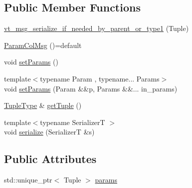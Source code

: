 \subsection*{Public Member Functions}
\begin{DoxyCompactItemize}
\item 
\hyperlink{structvt_1_1vrt_1_1collection_1_1_param_col_msg_3_01_tuple_00_01_col_t_00_01std_1_1enable__if__te13868956e9675e27cec8f332bda9d5e_a70d6345f2e6c9fab0c48b03bc87b3281}{vt\+\_\+msg\+\_\+serialize\+\_\+if\+\_\+needed\+\_\+by\+\_\+parent\+\_\+or\+\_\+type1} (Tuple)
\item 
\hyperlink{structvt_1_1vrt_1_1collection_1_1_param_col_msg_3_01_tuple_00_01_col_t_00_01std_1_1enable__if__te13868956e9675e27cec8f332bda9d5e_a3f158d2bce6804dae653475e383347e8}{Param\+Col\+Msg} ()=default
\item 
void \hyperlink{structvt_1_1vrt_1_1collection_1_1_param_col_msg_3_01_tuple_00_01_col_t_00_01std_1_1enable__if__te13868956e9675e27cec8f332bda9d5e_ae637b0bbec304ac77b345779f9e55c44}{set\+Params} ()
\item 
{\footnotesize template$<$typename Param , typename... Params$>$ }\\void \hyperlink{structvt_1_1vrt_1_1collection_1_1_param_col_msg_3_01_tuple_00_01_col_t_00_01std_1_1enable__if__te13868956e9675e27cec8f332bda9d5e_a5742af55a6e36a8a2db14b2812878fe2}{set\+Params} (Param \&\&p, Params \&\&... in\+\_\+params)
\item 
\hyperlink{structvt_1_1vrt_1_1collection_1_1_param_col_msg_3_01_tuple_00_01_col_t_00_01std_1_1enable__if__te13868956e9675e27cec8f332bda9d5e_a86867847002b70c52126323faa830dd6}{Tuple\+Type} \& \hyperlink{structvt_1_1vrt_1_1collection_1_1_param_col_msg_3_01_tuple_00_01_col_t_00_01std_1_1enable__if__te13868956e9675e27cec8f332bda9d5e_afc5714cc55c3b21fb9f1093863ad29b6}{get\+Tuple} ()
\item 
{\footnotesize template$<$typename SerializerT $>$ }\\void \hyperlink{structvt_1_1vrt_1_1collection_1_1_param_col_msg_3_01_tuple_00_01_col_t_00_01std_1_1enable__if__te13868956e9675e27cec8f332bda9d5e_ad9bdee8e5da604f69a69c09ba016e266}{serialize} (SerializerT \&s)
\end{DoxyCompactItemize}
\subsection*{Public Attributes}
\begin{DoxyCompactItemize}
\item 
std\+::unique\+\_\+ptr$<$ Tuple $>$ \hyperlink{structvt_1_1vrt_1_1collection_1_1_param_col_msg_3_01_tuple_00_01_col_t_00_01std_1_1enable__if__te13868956e9675e27cec8f332bda9d5e_a726c277943c0e2067383c9091c1a7f85}{params}
\end{DoxyCompactItemize}


